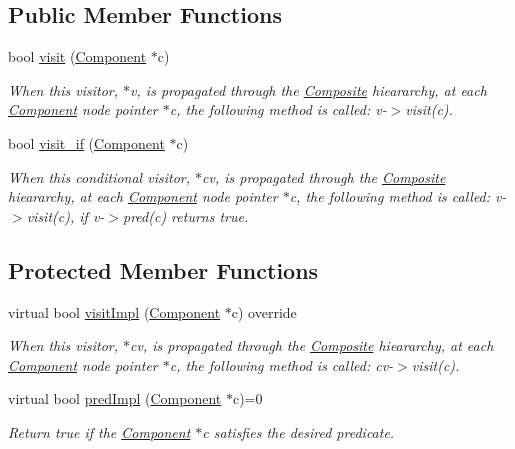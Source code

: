 \subsection*{Public Member Functions}
\begin{DoxyCompactItemize}
\item 
bool \hyperlink{classchem_1_1Visitor_a710015ef735e109c812edbb653d6d598}{visit} (\hyperlink{classchem_1_1Component}{Component} $\ast$c)
\begin{DoxyCompactList}\small\item\em When this visitor, $\ast$v, is propagated through the \hyperlink{classchem_1_1Composite}{Composite} hieararchy, at each \hyperlink{classchem_1_1Component}{Component} node pointer $\ast$c, the following method is called\-: v-\/$>$visit(c). \end{DoxyCompactList}\item 
bool \hyperlink{classchem_1_1Visitor_ad02a683bb0cf97d9df381c3efeb90a06}{visit\-\_\-if} (\hyperlink{classchem_1_1Component}{Component} $\ast$c)
\begin{DoxyCompactList}\small\item\em When this conditional visitor, $\ast$cv, is propagated through the \hyperlink{classchem_1_1Composite}{Composite} hieararchy, at each \hyperlink{classchem_1_1Component}{Component} node pointer $\ast$c, the following method is called\-: v-\/$>$visit(c), if v-\/$>$pred(c) returns true. \end{DoxyCompactList}\end{DoxyCompactItemize}
\subsection*{Protected Member Functions}
\begin{DoxyCompactItemize}
\item 
virtual bool \hyperlink{classchem_1_1ConcreteVisitor_a5dfd9a95b1c2b8bf73a643c20c7388bc}{visit\-Impl} (\hyperlink{classchem_1_1Component}{Component} $\ast$c) override
\begin{DoxyCompactList}\small\item\em When this visitor, $\ast$cv, is propagated through the \hyperlink{classchem_1_1Composite}{Composite} hieararchy, at each \hyperlink{classchem_1_1Component}{Component} node pointer $\ast$c, the following method is called\-: cv-\/$>$visit(c). \end{DoxyCompactList}\item 
virtual bool \hyperlink{classchem_1_1Visitor_a8f11a43266d18d1396236d0c5f3a8ad6}{pred\-Impl} (\hyperlink{classchem_1_1Component}{Component} $\ast$c)=0
\begin{DoxyCompactList}\small\item\em Return true if the \hyperlink{classchem_1_1Component}{Component} $\ast$c satisfies the desired predicate. \end{DoxyCompactList}\end{DoxyCompactItemize}


